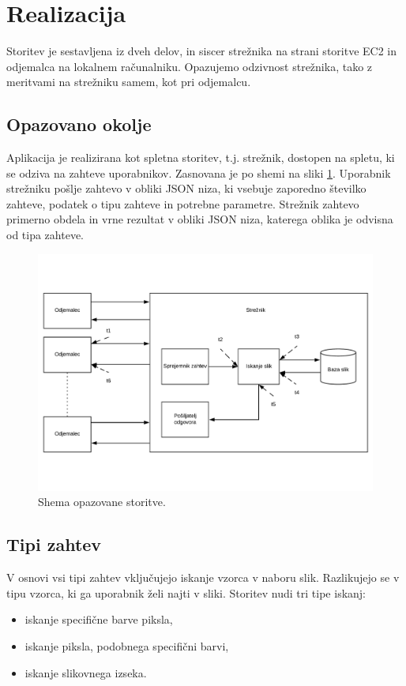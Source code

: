 \section{Realizacija}

Storitev je sestavljena iz dveh delov, in siscer strežnika na strani storitve EC2 in odjemalca na lokalnem računalniku.
Opazujemo odzivnost strežnika, tako z meritvami na strežniku samem, kot pri odjemalcu.

\subsection{Opazovano okolje}

Aplikacija je realizirana kot spletna storitev, t.j. strežnik, dostopen na spletu, ki se odziva na zahteve uporabnikov.
Zasnovana je po shemi na sliki \ref{fig:1_osnovnaShema}.
Uporabnik strežniku pošlje zahtevo v obliki JSON niza, ki vsebuje zaporedno številko zahteve, podatek o tipu zahteve in potrebne parametre.
Strežnik zahtevo primerno obdela in vrne rezultat v obliki JSON niza, katerega oblika je odvisna od tipa zahteve.

\begin{figure}[H]
\centering
\includegraphics[scale=0.4]{Img/1_shema.pdf}
\caption{Shema opazovane storitve.}
\label{fig:1_osnovnaShema}
\end{figure}

\subsection{Tipi zahtev}

V osnovi vsi tipi zahtev vključujejo iskanje vzorca v naboru slik.
Razlikujejo se v tipu vzorca, ki ga uporabnik želi najti v sliki.
Storitev nudi tri tipe iskanj:
\begin{itemize}
\item iskanje specifične barve piksla,
\item iskanje piksla, podobnega specifični barvi,
\item iskanje slikovnega izseka.
\end{itemize}

